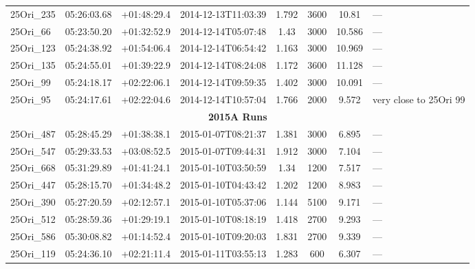 \documentclass[12pt]{article}
\begin{document}
\begin{table}[ht!]
\begin{center}
\begin{threeparttable}
\begin{tabular}{lccccccl}
	25Ori\_235    & 05:26:03.68 & +01:48:29.4 & 2014-12-13T11:03:39  & 1.792         & 3600             & 10.81  & ---                      \\
	25Ori\_66     & 05:23:50.20 & +01:32:52.9 & 2014-12-14T05:07:48  & 1.43          & 3000             & 10.586 & ---                      \\
	25Ori\_123    & 05:24:38.92 & +01:54:06.4 & 2014-12-14T06:54:42  & 1.163         & 3000             & 10.969 & ---                      \\
	25Ori\_135    & 05:24:55.01 & +01:39:22.9 & 2014-12-14T08:24:08  & 1.172         & 3600             & 11.128 & ---                      \\
	25Ori\_99     & 05:24:18.17 & +02:22:06.1 & 2014-12-14T09:59:35  & 1.402         & 3000             & 10.091 & ---                      \\
	25Ori\_95     & 05:24:17.61 & +02:22:04.6 & 2014-12-14T10:57:04  & 1.766         & 2000             & 9.572  & very close to 25Ori 99   \\
	\multicolumn{8}{c}{{\bf 2015A Runs}} \\
	25Ori\_487    & 05:28:45.29 & +01:38:38.1 & 2015-01-07T08:21:37  & 1.381         & 3000             & 6.895  & ---                      \\
	25Ori\_547    & 05:29:33.53 & +03:08:52.5 & 2015-01-07T09:44:31  & 1.912         & 3000             & 7.104  & ---                      \\
	25Ori\_668    & 05:31:29.89 & +01:41:24.1 & 2015-01-10T03:50:59  & 1.34          & 1200             & 7.517  & ---                      \\
	25Ori\_447    & 05:28:15.70 & +01:34:48.2 & 2015-01-10T04:43:42  & 1.202         & 1200             & 8.983  & ---                      \\
	25Ori\_390    & 05:27:20.59 & +02:12:57.1 & 2015-01-10T05:37:06  & 1.144         & 5100             & 9.171  & ---                      \\
	25Ori\_512    & 05:28:59.36 & +01:29:19.1 & 2015-01-10T08:18:19  & 1.418         & 2700             & 9.293  & ---                      \\
	25Ori\_586    & 05:30:08.82 & +01:14:52.4 & 2015-01-10T09:20:03  & 1.831         & 2700             & 9.339  & ---                      \\
	25Ori\_119    & 05:24:36.10 & +02:21:11.4 & 2015-01-11T03:55:13  & 1.283         & 600              & 6.307  & ---                      \\

\end{tabular}
\end{threeparttable}
\end{center}
\end{table}
\end{document}
